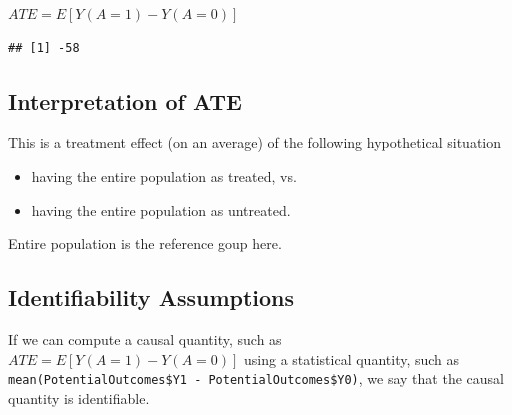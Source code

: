 \documentclass[
]{book}
\newenvironment{Shaded}{\begin{snugshade}}{\end{snugshade}}
\newcommand{\FunctionTok}[1]{\textcolor[rgb]{0.00,0.00,0.00}{#1}}
\newcommand{\NormalTok}[1]{#1}
\newcommand{\SpecialCharTok}[1]{\textcolor[rgb]{0.00,0.00,0.00}{#1}}
\providecommand{\tightlist}{%
  \setlength{\itemsep}{0pt}\setlength{\parskip}{0pt}}
\begin{document}
\(ATE = E[Y(A=1)-Y(A=0)]\)

\begin{Shaded}
\end{Shaded}

\begin{verbatim}
## [1] -58
\end{verbatim}

\hypertarget{interpretation-of-ate}{%
\subsection{Interpretation of ATE}\label{interpretation-of-ate}}

This is a treatment effect (on an average) of the following hypothetical situation

\begin{itemize}
\tightlist
\item
  having the entire population as treated, vs.
\item
  having the entire population as untreated.
\end{itemize}

Entire population is the reference goup here.

\hypertarget{identifiability-assumptions}{%
\subsection{Identifiability Assumptions}\label{identifiability-assumptions}}

If we can compute a causal quantity, such as \(ATE = E[Y(A=1)-Y(A=0)]\) using a statistical quantity, such as \texttt{mean(PotentialOutcomes\$Y1\ -\ PotentialOutcomes\$Y0)}, we say that the causal quantity is identifiable.
\end{document}
